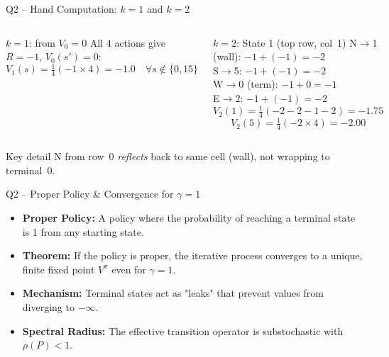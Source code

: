 \documentclass[aspectratio=169,12pt]{beamer}
\begin{document}
\begin{frame}{Q2 -- Hand Computation: $k=1$ and $k=2$}
  \begin{columns}[T]
    \begin{block}{$k=1$: from $V_0=0$}
      All 4 actions give $R=-1$, $V_0(s')=0$:
      \[
        V_1(s) = \tfrac{1}{4}(-1\times 4) = -1.0
        \quad\forall s\notin\{0,15\}
      \]
    \end{block}

    \begin{block}{$k=2$: State 1 (top row, col~1)}
      \scriptsize
      N$\to$1 (wall): $-1+(-1)=-2$\\
      S$\to$5: $-1+(-1)=-2$\\
      W$\to$0 (term): $-1+0=-1$\\
      E$\to$2: $-1+(-1)=-2$\\[4pt]
      \[
        V_2(1) = \tfrac{1}{4}(-2-2-1-2) = \mathbf{-1.75}
      \]
      \[
        V_2(5) = \tfrac{1}{4}(-2\times4) = \mathbf{-2.00}
      \]
    \end{block}
  \end{columns}

  \medskip
  \begin{alertblock}{Key detail}
    N from row~0 \emph{reflects} back to same cell (wall), not wrapping to terminal~0.
  \end{alertblock}
\end{frame}

\begin{frame}{Q2 -- Proper Policy \& Convergence for $\gamma=1$}
  \begin{itemize}
    \item \textbf{Proper Policy:} A policy where the probability of reaching a terminal state is 1 from any starting state.
    \item \textbf{Theorem:} If the policy is proper, the iterative process converges to a unique, finite fixed point $V^\pi$ even for $\gamma=1$.
    \item \textbf{Mechanism:} Terminal states act as "leaks" that prevent values from diverging to $-\infty$.
    \item \textbf{Spectral Radius:} The effective transition operator is substochastic with $\rho(P) < 1$.
  \end{itemize}
\end{frame}
\end{document}
